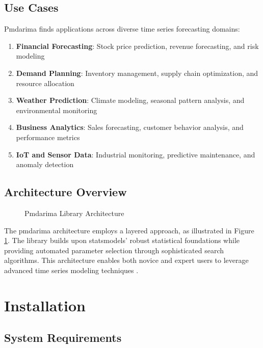 \subsection{Use Cases}
\label{subsec:usecases}

Pmdarima finds applications across diverse time series forecasting domains:

\begin{enumerate}
	\item \textbf{Financial Forecasting}: Stock price prediction, revenue forecasting, and risk modeling
	\item \textbf{Demand Planning}: Inventory management, supply chain optimization, and resource allocation
	\item \textbf{Weather Prediction}: Climate modeling, seasonal pattern analysis, and environmental monitoring
	\item \textbf{Business Analytics}: Sales forecasting, customer behavior analysis, and performance metrics
	\item \textbf{IoT and Sensor Data}: Industrial monitoring, predictive maintenance, and anomaly detection
\end{enumerate}

\subsection{Architecture Overview}
\label{subsec:architecture}

\begin{figure}[H]
	\centering
	
	\caption{Pmdarima Library Architecture \cite{Pmdarima:2024}}
	\label{fig:pmdarima_architecture}
\end{figure}

The pmdarima architecture employs a layered approach, as illustrated in Figure \ref{fig:pmdarima_architecture}. The library builds upon statsmodels' robust statistical foundations while providing automated parameter selection through sophisticated search algorithms. This architecture enables both novice and expert users to leverage advanced time series modeling techniques \cite{Smith:2023}.

\clearpage

\section{Installation}
\label{sec:installation}

\subsection{System Requirements}
\label{subsec:system_requirements}

